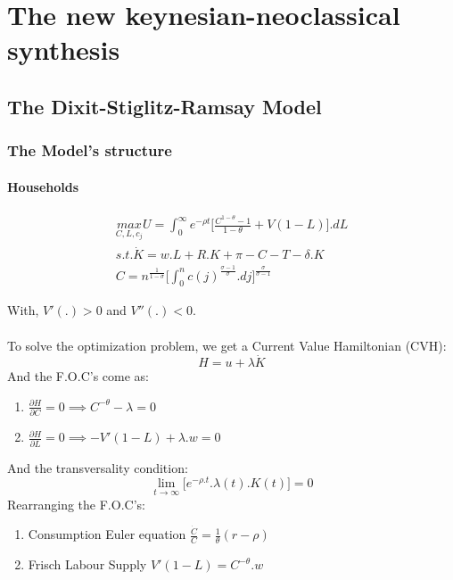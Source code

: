 \section{The new keynesian-neoclassical synthesis}
\subsection{The Dixit-Stiglitz-Ramsay Model}
\subsubsection{The Model's structure} 

\paragraph{Households}

\begin{equation*}
\begin{aligned}
    \underset{C,L,c_{j}}{max}U=\int_{0}^{\infty}e^{-\rho t}\bigg[\frac{C^{1-\theta}-1}{1-\theta}+V(1-L) \bigg].dL \\
    s.t. \Dot{K}=w.L+R.K+\pi-C-T-\delta.K \\
    C=n^{\frac{1}{1-\sigma}}\bigg[\int_{0}^{n}c(j)^{\frac{\sigma-1}{\sigma}}.dj \bigg]^{\frac{\sigma}{\sigma-1}}
\end{aligned}
\end{equation*}

With, $V'(.)>0$ and $V''(.)<0$.
\paragraph{}
To solve the optimization problem, we get a Current Value Hamiltonian (CVH): 
\begin{equation*}
    H=u+\lambda\Dot{K}
\end{equation*}
And the F.O.C's come as:
\begin{enumerate}
    \item $\frac{\partial H}{\partial C}=0 \implies C^{-\theta}-\lambda=0$
    \item $\frac{\partial H}{\partial L}=0 \implies -V'(1-L)+\lambda.w=0$
\end{enumerate}
And the transversality condition:
\begin{equation*}
    \lim_{t\to \infty}\Bigg[e^{-\rho.t}.\lambda(t).K(t) \bigg]=0
\end{equation*}
Rearranging the F.O.C's:
\begin{enumerate}
    \item Consumption Euler equation $\frac{\Dot{C}}{C}=\frac{1}{\theta}(r-\rho)$
    \item Frisch Labour Supply $V'(1-L)=C^{-\theta}.w$
\end{enumerate}

